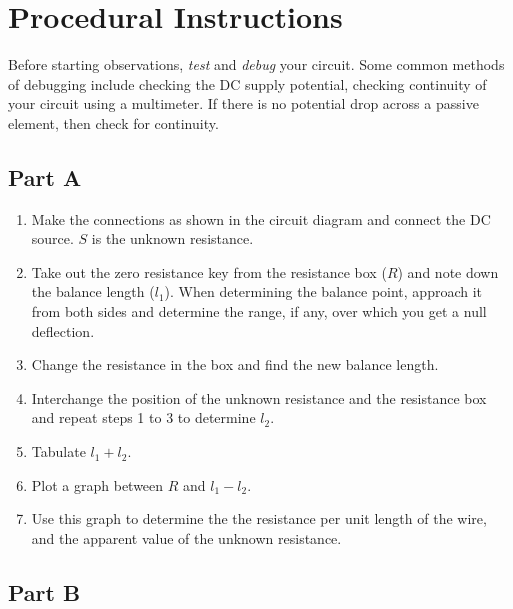 \section*{Procedural Instructions}

\begin{imp}
Before starting observations, \textit{test} and \textit{debug} your circuit. Some common methods of debugging include checking the DC supply potential, checking continuity of your circuit using a multimeter. If there is no potential drop across a passive element, then check for continuity.
\end{imp}


\subsection*{Part A}

\begin{enumerate}
    \item Make the connections as shown in the circuit diagram and connect the DC source. $S$ is the unknown resistance.
    \item Take out the zero resistance key from the resistance box ($R$) and note down the balance length ($l_1$). When determining the balance point, approach it from both sides and determine the range, if any, over which you get a null deflection. 
    \item Change the resistance in the box and find the new balance length.
    \item Interchange the position of the unknown resistance and the resistance box and repeat steps 1 to 3 to determine $l_2$.
    \item Tabulate $l_1 + l_2$.
    \item Plot a graph between $R$ and $l_1 -l_2$.
    \item Use this graph to determine the the resistance per unit length of the wire, and the apparent value of the unknown resistance.
\end{enumerate}

\subsection*{Part B}

